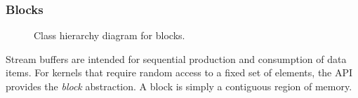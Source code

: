 






\subsubsection{Blocks}
\label{sec:blocks}

\begin{figure}[t]
\begin{center}
\end{center}
\vspace{-12pt}
\caption{Class hierarchy diagram for blocks.\protect\label{fig:inherit-block}}
\end{figure}

Stream buffers are intended for sequential production and consumption
of data items.  For kernels that require random access to a fixed set
of elements, the API provides the {\it block} abstraction.  A block is
simply a contiguous region of memory.

